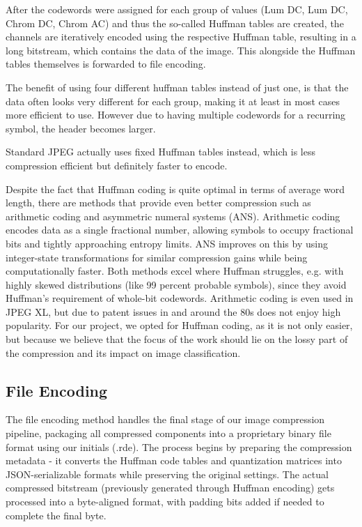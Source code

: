 After the codewords were assigned for each group of values (Lum DC, Lum DC, Chrom DC, Chrom AC) and thus the so-called Huffman tables are created, the channels are iteratively encoded using the respective Huffman table, resulting in a long bitstream, which contains the data of the image. This alongside the Huffman tables themselves is forwarded to file encoding.

The benefit of using four different huffman tables instead of just one, is that the data often looks very different for each group, making it at least in most cases more efficient to use. However due to having multiple codewords for a recurring symbol, the header becomes larger.

Standard JPEG actually uses fixed Huffman tables instead, which is less compression efficient but definitely faster to encode.

Despite the fact that Huffman coding is quite optimal in terms of average word length, there are methods that provide even better compression such as arithmetic coding and asymmetric numeral systems (ANS). Arithmetic coding encodes data as a single fractional number, allowing symbols to occupy fractional bits and tightly approaching entropy limits. ANS improves on this by using integer-state transformations for similar compression gains while being computationally faster. Both methods excel where Huffman struggles, e.g. with highly skewed distributions (like 99 percent probable symbols), since they avoid Huffman's requirement of whole-bit codewords. Arithmetic coding is even used in JPEG XL, but due to patent issues in and around the 80s does not enjoy high popularity. For our project, we opted for Huffman coding, as it is not only easier, but because we believe that the focus of the work should lie on the lossy part of the compression and its impact on image classification. \cite{wiegand_source}
\subsection{File Encoding}
The file encoding method handles the final stage of our image compression pipeline, packaging all compressed components into a proprietary binary file format using our initials (.rde). The process begins by preparing the compression metadata - it converts the Huffman code tables and quantization matrices into JSON-serializable formats while preserving the original settings. The actual compressed bitstream (previously generated through Huffman encoding) gets processed into a byte-aligned format, with padding bits added if needed to complete the final byte.

